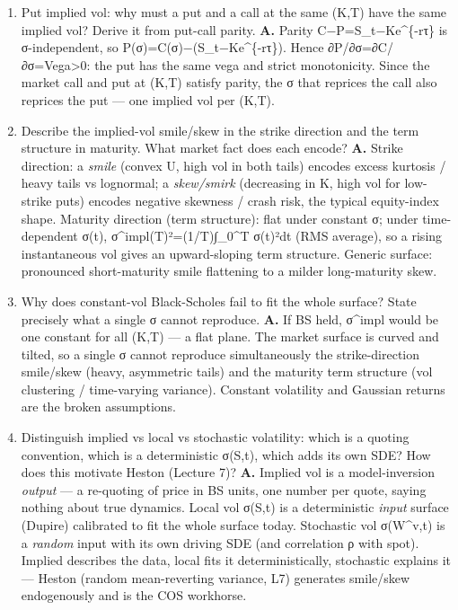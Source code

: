 \documentclass[
  11pt,
]{article}
\begin{document}
\begin{enumerate}
  overshoot)? \textbf{A.} ∂²C/∂σ² ∝ d\_1d\_2, which vanishes at
  =√(2\textbar ln(S\_t/K)+rτ\textbar/τ): C is convex for σ\textless,
  concave for σ\textgreater, so  is the inflection point and where
  Vega=C' is \emph{maximal}. Starting there, the contraction ratio
  1−F'(ξ)/F'()∈(0,1) because F'() is the maximum slope, so the first
  step cannot overshoot the root; the iterates then stay on the monotone
  (concave) side and converge monotonically and quadratically.
\item
  Put implied vol: why must a put and a call at the same (K,T) have the
  same implied vol? Derive it from put-call parity. \textbf{A.} Parity
  C−P=S\_t−Ke\^{}\{-rτ\} is σ-independent, so
  P(σ)=C(σ)−(S\_t−Ke\^{}\{-rτ\}). Hence ∂P/∂σ=∂C/∂σ=Vega\textgreater0:
  the put has the same vega and strict monotonicity. Since the market
  call and put at (K,T) satisfy parity, the σ that reprices the call
  also reprices the put --- one implied vol per (K,T).
\item
  Describe the implied-vol smile/skew in the strike direction and the
  term structure in maturity. What market fact does each encode?
  \textbf{A.} Strike direction: a \emph{smile} (convex U, high vol in
  both tails) encodes excess kurtosis / heavy tails vs lognormal; a
  \emph{skew/smirk} (decreasing in K, high vol for low-strike puts)
  encodes negative skewness / crash risk, the typical equity-index
  shape. Maturity direction (term structure): flat under constant σ;
  under time-dependent σ(t), σ\^{}impl(T)²=(1/T)∫\_0\^{}T σ(t)²dt (RMS
  average), so a rising instantaneous vol gives an upward-sloping term
  structure. Generic surface: pronounced short-maturity smile flattening
  to a milder long-maturity skew.
\item
  Why does constant-vol Black-Scholes fail to fit the whole surface?
  State precisely what a single σ cannot reproduce. \textbf{A.} If BS
  held, σ\^{}impl would be one constant for all (K,T) --- a flat plane.
  The market surface is curved and tilted, so a single σ cannot
  reproduce simultaneously the strike-direction smile/skew (heavy,
  asymmetric tails) and the maturity term structure (vol clustering /
  time-varying variance). Constant volatility and Gaussian returns are
  the broken assumptions.
\item
  Distinguish implied vs local vs stochastic volatility: which is a
  quoting convention, which is a deterministic σ(S,t), which adds its
  own SDE? How does this motivate Heston (Lecture 7)? \textbf{A.}
  Implied vol is a model-inversion \emph{output} --- a re-quoting of
  price in BS units, one number per quote, saying nothing about true
  dynamics. Local vol σ(S,t) is a deterministic \emph{input} surface
  (Dupire) calibrated to fit the whole surface today. Stochastic vol
  σ(W\^{}v,t) is a \emph{random} input with its own driving SDE (and
  correlation ρ with spot). Implied describes the data, local fits it
  deterministically, stochastic explains it --- Heston (random
  mean-reverting variance, L7) generates smile/skew endogenously and is
  the COS workhorse.
\end{enumerate}
\end{document}
